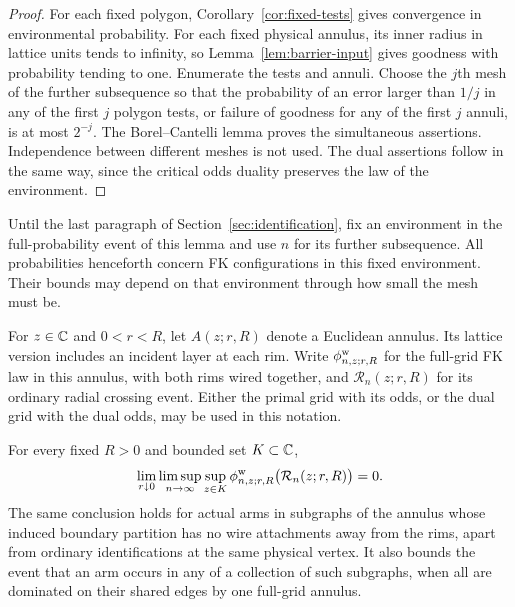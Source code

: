 \begin{proof}
For each fixed polygon, Corollary~\ref{cor:fixed-tests} gives
convergence in environmental probability.  For each fixed physical
annulus, its inner radius in lattice units tends to infinity, so
Lemma~\ref{lem:barrier-input} gives
goodness with probability tending to one.  Enumerate the tests and
annuli.  Choose the $j$th mesh of the further subsequence so that the
probability of an error larger than $1/j$ in any of the first $j$
polygon tests, or failure of goodness for any of the first $j$ annuli,
is at most $2^{-j}$.  The Borel--Cantelli lemma proves the simultaneous
assertions.  Independence between different meshes is not used.
The dual assertions follow in the same way, since the critical odds
duality preserves the law of the environment.
\end{proof}

Until the last paragraph of Section~\ref{sec:identification}, fix an
environment in the full-probability event of this lemma and use $n$
for its further subsequence.  All probabilities henceforth concern FK
configurations in this fixed environment.  Their bounds may depend on
that environment through how small the mesh must be.

For $z\in\mathbb C$ and $0<r<R$, let $A(z;r,R)$ denote a Euclidean annulus.
Its lattice version includes an incident layer at each rim.  Write
$\phi^{\rm w}_{n,z;r,R}$ for the full-grid FK law in this annulus,
with both rims wired together, and $\mathcal R_n(z;r,R)$ for its
ordinary radial crossing event.  Either the primal grid with its
odds, or the dual grid with the dual odds, may be used in this notation.

\begin{lemma}
\label{lem:full-grid-arm}
For every fixed $R>0$ and bounded set $K\subset\mathbb C$,
\begin{equation}\label{eq:full-grid-arm}
 \lim_{r\downarrow0}\limsup_{n\to\infty}
 \sup_{z\in K}
 \phi^{\rm w}_{n,z;r,R}\bigl(\mathcal R_n(z;r,R)\bigr)=0.
\end{equation}
The same conclusion holds for actual arms in subgraphs of the annulus
whose induced boundary partition has no wire attachments away from
the rims, apart from ordinary identifications at the same physical
vertex.  It also bounds the event that an arm occurs in any of a
collection of such subgraphs, when all are dominated on their shared
edges by one full-grid annulus.
\end{lemma}

